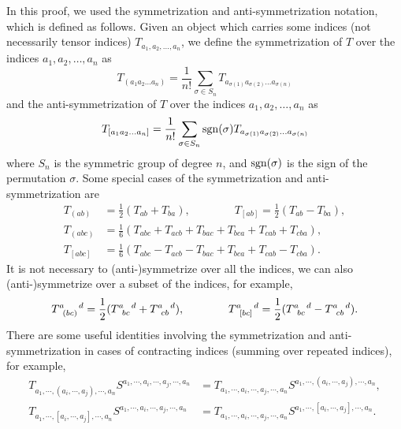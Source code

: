 In this proof, we used the symmetrization and anti-symmetrization notation, which is defined as follows. Given an object which carries some indices (not necessarily tensor indices) \(T_{a_1, a_2, \ldots, a_n}\), we define the symmetrization of \(T\) over the indices \(a_1, a_2, \ldots, a_n\) as
\begin{equation*}
    T_{(a_1 a_2 \ldots a_n)} = \frac{1}{n!} \sum_{\sigma \in S_n} T_{a_{\sigma(1)} a_{\sigma(2)} \ldots a_{\sigma(n)}}
\end{equation*}
and the anti-symmetrization of \(T\) over the indices \(a_1, a_2, \ldots, a_n\) as
\begin{equation*}
    T_{[a_1 a_2 \ldots a_n]} = \frac{1}{n!} \sum_{\sigma \in S_n} \operatorname{sgn}(\sigma) T_{a_{\sigma(1)} a_{\sigma(2)} \ldots a_{\sigma(n)}}
\end{equation*}
where \(S_n\) is the symmetric group of degree \(n\), and \(\operatorname{sgn}(\sigma)\) is the sign of the permutation \(\sigma\). Some special cases of the symmetrization and anti-symmetrization are
\begin{align*}
    T_{(a b)}   & = \frac{1}{2} (T_{a b} + T_{b a}), \qquad \qquad T_{[a b]} = \frac{1}{2} (T_{a b} - T_{b a}), \\
    T_{(a b c)} & = \frac{1}{6} (T_{a b c} + T_{a c b} + T_{b a c} + T_{b c a} + T_{c a b} + T_{c b a}),        \\
    T_{[a b c]} & = \frac{1}{6} (T_{a b c} - T_{a c b} - T_{b a c} + T_{b c a} + T_{c a b} - T_{c b a}).
\end{align*}
It is not necessary to (anti-)symmetrize over all the indices, we can also (anti-)symmetrize over a subset of the indices, for example,
\begin{equation*}
    \tensor{T}{^a_{(b c)}^d} = \frac{1}{2} (\tensor{T}{^a_{b c}^d} + \tensor{T}{^a_{c b}^d}), \qquad \qquad \tensor{T}{^a_{[b c]}^d} = \frac{1}{2} (\tensor{T}{^a_{b c}^d} - \tensor{T}{^a_{c b}^d}).
\end{equation*}
There are some useful identities involving the symmetrization and anti-symmetrization in cases of contracting indices (\ie summing over repeated indices), for example,
\begin{align*}
    T_{a_1, \cdots, (a_i, \cdots, a_j), \cdots, a_n} S^{a_1, \cdots, a_i, \cdots, a_j, \cdots, a_n} & = T_{a_1, \cdots, a_i, \cdots, a_j, \cdots, a_n} S^{a_1, \cdots, (a_i, \cdots, a_j), \cdots, a_n}, \\
    T_{a_1, \cdots, [a_i, \cdots, a_j], \cdots, a_n} S^{a_1, \cdots, a_i, \cdots, a_j, \cdots, a_n} & = T_{a_1, \cdots, a_i, \cdots, a_j, \cdots, a_n} S^{a_1, \cdots, [a_i, \cdots, a_j], \cdots, a_n}.
\end{align*}
